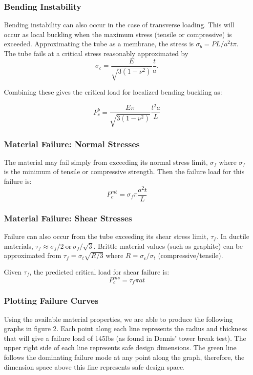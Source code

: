 \documentclass{report}
\begin{document}
\begin{multicols}{2}
\subsubsection{Bending Instability}

Bending instability can also occur in the case of transverse loading. This will occur as local buckling when the maximum stress (tensile or compressive) is exceeded. Approximating the tube as a membrane, the stress is $\sigma_{b} = PL/a^2t\pi$. The tube fails at a critical stress reasonably approximated by
$$
\sigma_{c}=\frac{E}{\sqrt{3(1-\nu^2)}}\frac{t}{a}.
$$

Combining these gives the critical load for localized bending buckling as:

$$
P_{c}^{b} = \frac{E \pi}{\sqrt{3(1-\nu^2)}}\frac{t^2a}{L}
$$
\subsubsection{Material Failure: Normal Stresses}

The material may fail simply from exceeding its normal stress limit, $\sigma_{f}$ where $\sigma_{f}$ is the minimum of tensile or compressive strength. Then the failure load for this failure is:
$$
P_{c}^{mb} = \sigma_{f} \pi \frac{a^2t}{L}
$$
\subsubsection{Material Failure: Shear Stresses}

Failure can also occur from the tube exceeding its shear stress limit, $\tau_{f}$. In ductile materials, $\tau_{f} \approx \sigma_{f}/2 \ \text{or} \ \sigma_{f}/\sqrt{3}$. Brittle material values (such as graphite) can be approximated from $\tau_{f} = \sigma_{t}\sqrt{R/3} $ where $R = \sigma_{c}/\sigma_{t}$ (compressive/tensile).

Given $\tau_{f}$, the predicted critical load for shear failure is:
$$
P_{c}^{ms} = \tau_{f}\pi at
$$

\subsubsection{Plotting Failure Curves}

Using the available material properties, we are able to produce the following graphs in figure 2. Each point along each line represents the radius and thickness that will give a failure load of 145lbs (as found in Dennis' tower break test). The upper right side of each line represents safe design dimensions. The green line follows the dominating failure mode at any point along the graph, therefore, the dimension space above this line represents safe design space.


\end{multicols}
\end{document}
